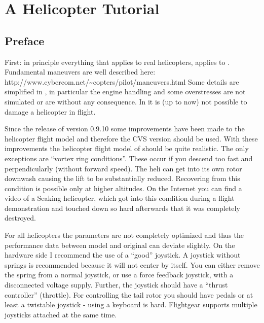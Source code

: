 \chapter{A Helicopter Tutorial\label{helicopter}}

\section{Preface}
 
First: in principle everything that applies to real helicopters, applies 
to \FlightGear. Fundamental maneuvers are well described here:\\ 
{http://www.cybercom.net/\~{}copters/pilot/maneuvers.html} Some details are 
simplified in \FlightGear, in particular the engine handling and some 
overstresses are not simulated or are without any consequence. 
In \FlightGear it is (up to now) not possible to damage a helicopter in 
flight. 


Since the release of version 0.9.10 some improvements have been made to the 
helicopter flight model and therefore the CVS version should be used. 
With these improvements the helicopter flight model of \FlightGear should be 
quite realistic. The only exceptions are ``vortex ring conditions''. 
These occur if you descend too fast and perpendicularly 
(without forward speed). The heli can get into its own rotor downwash 
causing the lift to be substantially reduced. Recovering from this condition 
is possible only at higher altitudes. On the Internet you can find a video 
of a Seaking helicopter, which got into this condition during a flight 
demonstration and touched down so hard afterwards that it was completely 
destroyed. 

For all \FlightGear helicopters the parameters are not completely optimized 
and thus the performance data between model and original can deviate slightly. 
On the hardware side I recommend the use of a ``good'' joystick. A joystick 
without springs is recommended because it will not center by itself. You 
can either remove the spring from a normal joystick, or use a force feedback 
joystick, with a disconnected voltage supply. Further, the joystick should 
have a ``thrust controller'' (throttle). For controlling the tail rotor you 
should have pedals or at least a twistable joystick - using a keyboard is hard.
Flightgear supports multiple joysticks attached at the same time. 

